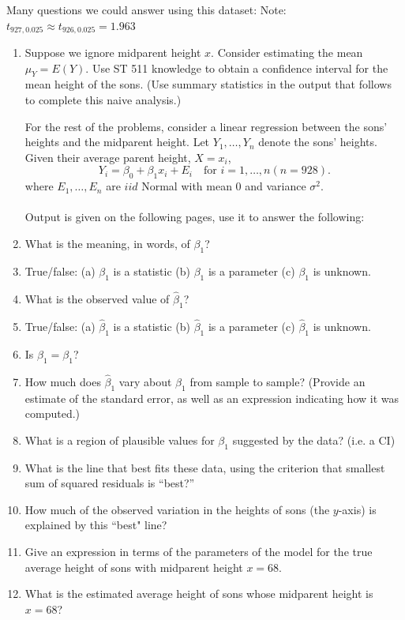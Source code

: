 \documentclass{report}
\begin{document}
Many questions we could answer using this dataset: Note: $t_{927,0.025}\approx t_{926,0.025}=1.963$
\begin{enumerate}
\item Suppose we ignore midparent height $x$.  Consider estimating the mean $\mu_{Y}=E(Y)$.  Use ST 511 knowledge to obtain a confidence interval for the mean height of the sons.  (Use summary statistics in the output that follows to complete this naive analysis.)\\

\newpage

\noindent For the rest of the problems, consider a linear regression between the sons' heights and the midparent height.  Let $Y_1,\ldots,Y_n$ denote the sons' heights.  Given their average parent height, $X=x_i$,
$$ Y_i = \beta_0 + \beta_1 x_i + E_i \ \ \ \mbox{ for }i=1,\ldots,n (n=928).$$
where $E_1,\ldots,E_n$ are $iid$ Normal with mean 0 and variance $\sigma^2$.\\~\\
Output is given on the following pages, use it to answer the following:\\
\item What is the meaning, in words, of $\beta_1$?
\item True/false: (a) $\beta_1$ is a statistic (b) $\beta_1$ is a parameter (c) $\beta_1$ is unknown.
\item What is the observed value of $\hat\beta_1$?
\item True/false: (a) $\hat\beta_1$ is a statistic (b) $\hat\beta_1$ is a parameter (c) $\hat\beta_1$ is unknown.
\item Is $\hat\beta_1=\beta_1$?
\item How much does $\hat\beta_1$ vary about $\beta_1$ from sample to sample?  (Provide an estimate of the standard error, as well as an expression indicating how it was computed.)
\item What is a region of plausible values for $\beta_1$ suggested by the data? (i.e. a CI)
\item What is the line that best fits these data, using the criterion that smallest sum of squared residuals is ``best?''
\item How much of the observed variation in the heights of sons (the $y$-axis) is explained by this ``best" line?
\item Give an expression in terms of the parameters of the model for the true average height of sons with midparent height $x=68$.
\item What is the estimated average height of sons whose midparent height is $x=68$?

\end{enumerate}
\end{document}
